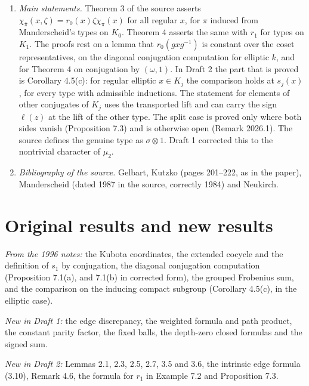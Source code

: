 \documentclass[12pt,letterpaper]{article}
\begin{document}
\begin{enumerate}
\item \emph{Main statements.} Theorem 3 of the source asserts $\chi_{\overline\pi}(x,\zeta)=r_0(x)\zeta\chi_\pi(x)$ for all regular $x$, for $\pi$ induced from Manderscheid's types on $K_0$. Theorem 4 asserts the same with $r_1$ for types on $K_1$. The proofs rest on a lemma that $r_0(gxg^{-1})$ is constant over the coset representatives, on the diagonal conjugation computation for elliptic $k$, and for Theorem 4 on conjugation by $(\omega,1)$. In Draft 2 the part that is proved is Corollary 4.5(c): for regular elliptic $x\in K_j$ the comparison holds at $s_j(x)$, for every type with admissible inductions. The statement for elements of other conjugates of $K_j$ uses the transported lift and can carry the sign $\ell(z)$ at the lift of the other type. The split case is proved only where both sides vanish (Proposition 7.3) and is otherwise open (Remark 2026.1). The source defines the genuine type as $\sigma\otimes1$. Draft 1 corrected this to the nontrivial character of $\mu_2$.
\item \emph{Bibliography of the source.} Gelbart, Kutzko (pages 201--222, as in the paper), Manderscheid (dated 1987 in the source, correctly 1984) and Neukirch.
\end{enumerate}

\section{Original results and new results}
\emph{From the 1996 notes:} the Kubota coordinates, the extended cocycle and the definition of $s_1$ by conjugation, the diagonal conjugation computation (Proposition 7.1(a), and 7.1(b) in corrected form), the grouped Frobenius sum, and the comparison on the inducing compact subgroup (Corollary 4.5(c), in the elliptic case).

\emph{New in Draft 1:} the edge discrepancy, the weighted formula and path product, the constant parity factor, the fixed balls, the depth-zero closed formulas and the signed sum.

\emph{New in Draft 2:} Lemmas 2.1, 2.3, 2.5, 2.7, 3.5 and 3.6, the intrinsic edge formula (3.10), Remark 4.6, the formula for $r_1$ in Example 7.2 and Proposition 7.3.
\end{document}
